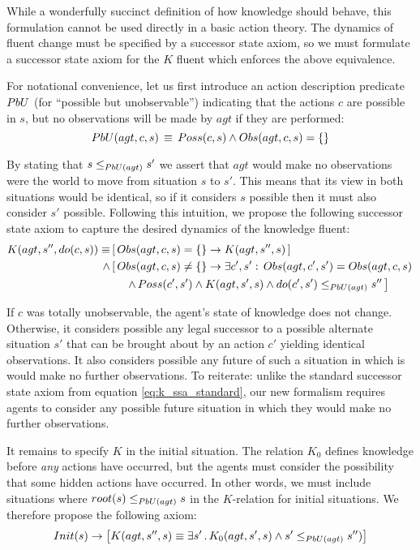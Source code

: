 While a wonderfully succinct definition of how knowledge should behave,
this formulation cannot be used directly in a basic action theory.
The dynamics of fluent change must be specified by a successor state
axiom, so we must formulate a successor state axiom for the $K$ fluent
which enforces the above equivalence.

For notational convenience, let us first introduce an action description
predicate $PbU$ (for {}``possible but unobservable'') indicating
that the actions $c$ are possible in $s$, but no observations will
be made by $agt$ if they are performed:\begin{equation}
PbU(agt,c,s)\,\equiv\, Poss(c,s)\wedge Obs(agt,c,s)=\{\}\label{eqn:PbU_defn}\end{equation}


By stating that $s\leq_{PbU(agt)}s'$ we assert that $agt$ would
make no observations were the world to move from situation $s$ to
$s'$. This means that its view in both situations would be identical,
so if it considers $s$ possible then it must also consider $s'$
possible. Following this intuition, we propose the following successor
state axiom to capture the desired dynamics of the knowledge fluent:\begin{align}
K(agt,s'',do(c,s))\equiv & \left[\, Obs(agt,c,s)=\{\}\rightarrow K(agt,s'',s)\,\right]\nonumber \\
\wedge & \left[\, Obs(agt,c,s)\neq\{\}\rightarrow\exists c',s':\, Obs(agt,c',s')=Obs(agt,c,s)\right.\nonumber \\
 & \left.\,\,\,\,\,\,\,\,\wedge\, Poss(c',s')\wedge K(agt,s',s)\wedge do(c',s')\leq_{PbU(agt)}s''\,\right]\label{eqn:new_k_ssa}\end{align}


If $c$ was totally unobservable, the agent's state of knowledge does
not change. Otherwise, it considers possible any legal successor to
a possible alternate situation $s'$ that can be brought about by
an action $c'$ yielding identical observations. It also considers
possible any future of such a situation in which is would make no
further observations. To reiterate: unlike the standard successor
state axiom from equation \eqref{eq:k_ssa_standard}, our new formalism
requires agents to consider any possible future situation in which
they would make no further observations.

It remains to specify $K$ in the initial situation. The relation
$K_{0}$ defines knowledge before \emph{any} actions have occurred,
but the agents must consider the possibility that some hidden actions
have occurred. In other words, we must include situations where $root(s)\leq_{PbU(agt)}s$
in the $K$-relation for initial situations. We therefore propose
the following axiom:\begin{gather}
Init(s)\rightarrow\left[K(agt,s'',s)\equiv\exists s'\,.\, K_{0}(agt,s',s)\wedge s'\leq_{PbU(agt)}s'')\right]\label{eqn:new_k_s0}\end{gather}


